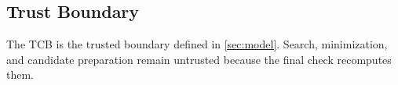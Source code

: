 \subsection{Trust Boundary}

The TCB is the trusted boundary defined in \cref{sec:model}.
Search, minimization, and candidate preparation remain untrusted because the final check recomputes them.
